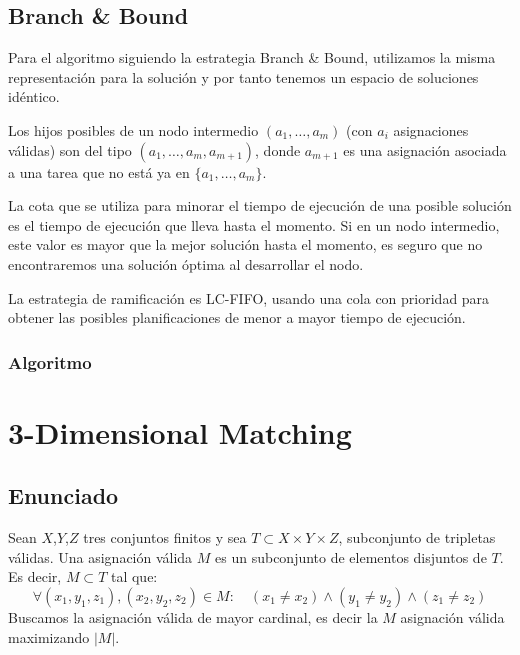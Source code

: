 \documentclass[a4paper, 11pt]{article} %
\begin{document}
      \small
      \texttt{}
      \normalsize
    
    \subsection{Branch \& Bound}
      Para el algoritmo siguiendo la estrategia Branch \& Bound, utilizamos la misma representación para la 
      solución y por tanto tenemos un espacio de soluciones idéntico.
      
      Los hijos posibles de un nodo intermedio $(a_1, \dots, a_m)$ (con $a_i$ asignaciones válidas) son del tipo 
      $(a_1, \dots, a_m, a_{m+1})$, donde $a_{m+1}$ es una asignación asociada a una tarea que no está ya en 
      $\{a_1, \dots, a_m\}$.
      
      La cota que se utiliza para minorar el tiempo de ejecución de una posible solución es el tiempo de ejecución 
      que lleva hasta el momento. Si en un nodo intermedio, este valor es mayor que la mejor solución hasta el 
      momento, es seguro que no encontraremos una solución óptima al desarrollar el nodo.
      
      La estrategia de ramificación es LC-FIFO, usando una cola con prioridad para obtener las posibles 
      planificaciones de menor a mayor tiempo de ejecución.
    
      \subsubsection{Algoritmo}
      
        \small
        \texttt{}
        \normalsize
      
    \section{3-Dimensional Matching}
    \subsection{Enunciado}
    Sean $X$,$Y$,$Z$ tres conjuntos finitos y sea $T \subset X \times Y \times Z$, subconjunto de tripletas válidas.
    Una asignación válida $M$ es un subconjunto de elementos disjuntos de $T$. Es decir, $M \subset T$ tal que:
    \begin{equation}
        \forall (x_1,y_1,z_1), (x_2,y_2,z_2) \in M : \quad (x_1 \neq x_2) \wedge (y_1 \neq y_2) \wedge (z_1 \neq z_2)
        \end{equation} 
        Buscamos la asignación válida de mayor cardinal, es decir la $M$ asignación válida maximizando $|M|$.
        
\end{document}
